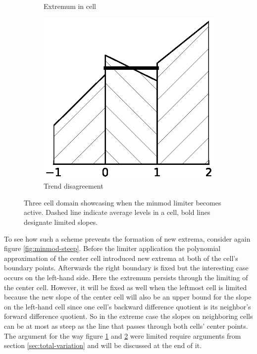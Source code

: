 \begin{figure}[h]
\begin{subfigure}{0.5\columnwidth}
    \caption{Extremum in cell}
    \label{fig:minmod-extremum}
  \end{subfigure}
  \begin{subfigure}{0.5\columnwidth}
    \centering
    \includegraphics[width=\textwidth]{figures/minmod-c}
    \caption{Trend disagreement}
    \label{fig:minmod-trend}
  \end{subfigure}
  \caption{Three cell domain showcasing when the minmod limiter becomes active. Dashed line indicate average levels in a cell, bold lines designate limited slopes.}
  \label{fig:minmod}
\end{figure}

To see how such a scheme prevents the formation of new extrema, consider again figure \ref{fig:minmod-steep}.
Before the limiter application the polynomial approximation of the center cell introduced new extrema at both of the cell's boundary points.
Afterwards the right boundary is fixed but the interesting case occurs on the left-hand side.
Here the extremum persists through the limiting of the center cell.
However, it will be fixed as well when the leftmost cell is limited because the new slope of the center cell will also be an upper bound for the slope on the left-hand cell since one cell's backward difference quotient is its neighbor's forward difference quotient.
So in the extreme case the slopes on neighboring cells can be at most as steep as the line that passes through both cells' center points.
The argument for the way figure \ref{fig:minmod-extremum} and \ref{fig:minmod-trend} were limited require arguments from section \ref{sec:total-variation} and will be discussed at the end of it.
